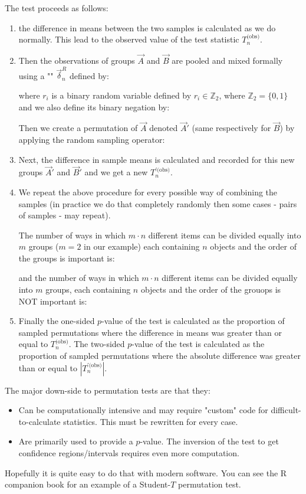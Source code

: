 	The test proceeds as follows:
	\begin{enumerate}
		\item the difference in means between the two samples is calculated as we do normally. This lead to the observed value of the test statistic $T_n^{\text{(obs)}}$.
		
		\item Then the observations of groups $\vec{A}$ and $\vec{B}$ are pooled and mixed formally using a "" $\vec{\delta}_n^R$ defined by:
		
		where $r_i$ is a binary random variable defined by $r_i\in\mathbb{Z}_2$, where $\mathbb{Z}_2=\{0,1\}$ and we also define its binary negation by:
		
		Then we create a permutation of $\vec{A}$ denoted $\vec{A}'$ (same respectively for $\vec{B}$) by applying the random sampling operator:
		
		
		\item Next, the difference in sample means is calculated and recorded for this new groups $\vec{A}'$ and $\vec{B}'$ and we get a new $T_{n}^{'\text{(obs)}}$.
		
		\item We repeat the above procedure for every possible way of combining the samples (in practice we do that completely randomly then some cases - pairs of samples - may repeat).
		
		The number of ways in which $m\cdot n$ different items can be divided equally into $m$ groups ($m=2$ in our example) each containing $n$ objects and the order of the groups is important is:
		
		and the number of ways in which $m\cdot n$ different items can be divided equally into $m$ groups, each containing $n$ objects and the order of the grouops is NOT important is:
		
		
		\item Finally the one-sided $p$-value of the test is calculated as the proportion of sampled permutations where the difference in means was greater than or equal to $T_{n}^{\text{(obs)}}$. The two-sided $p$-value of the test is calculated as the proportion of sampled permutations where the absolute difference was greater than or equal to $|T_{n}^{'\text{(obs)}}|$.
	\end{enumerate}
	
	The major down-side to permutation tests are that they:
	\begin{itemize}
		\item Can be computationally intensive and may require "custom" code for difficult-to-calculate statistics. This must be rewritten for every case.
		\item Are primarily used to provide a $p$-value. The inversion of the test to get confidence regions/intervals requires even more computation.
	\end{itemize}
	Hopefully it is quite easy to do that with modern software. You can see the R companion book for an example of a Student-$T$ permutation test.
	
